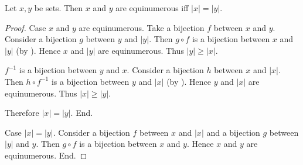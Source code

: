 \documentclass[10pt]{article}
\begin{document}
  \begin{forthel}
    \begin{proposition}[id=SET_THEORY_06_6920913721229312,printid]
      Let $x, y$ be sets.
      Then $x$ and $y$ are equinumerous iff $|x| = |y|$.
    \end{proposition}
    \begin{proof}
      Case $x$ and $y$ are equinumerous.
        Take a bijection $f$ between $x$ and $y$.
        Consider a bijection $g$ between $y$ and $|y|$.
        Then $g \circ f$ is a bijection between $x$ and $|y|$ (by ).
        Hence $x$ and $|y|$ are equinumerous.
        Thus $|y| \geq |x|$.

        $f^{-1}$ is a bijection between $y$ and $x$.
        Consider a bijection $h$ between $x$ and $|x|$.
        Then $h \circ f^{-1}$ is a bijection between $y$ and $|x|$ (by ).
        Hence $y$ and $|x|$ are equinumerous.
        Thus $|x| \geq |y|$.

        Therefore $|x| = |y|$.
      End.

      Case $|x| = |y|$.
        Consider a bijection $f$ between $x$ and $|x|$ and a bijection $g$
        between $|y|$ and $y$.
        Then $g \circ f$ is a bijection between $x$ and $y$.
        Hence $x$ and $y$ are equinumerous.
      End.
    \end{proof}
  \end{forthel}
\end{document}
